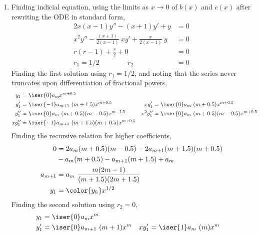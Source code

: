 \begin{enumerate}
    \item Finding indicial equation, using the limits as $ x \rightarrow 0 $
          of $ b(x) $ and $ c(x) $ after rewriting the ODE in standard form,
          \begin{align}
              2x(x-1)y'' - (x+1)y' + y                                 & = 0 \\
              x^2y'' - \frac{(x+1)}{2(x-1)}\ xy' + \frac{x}{2(x-1)}\ y & = 0 \\
              r(r-1) + \frac{r}{2} + 0                                 & = 0 \\
              r_1 = 1/2 \qquad\qquad r_2                               & = 0
          \end{align}
          Finding the first solution using $ r_1 = 1/2 $, and noting that the series
          never truncates upon differentiation of fractional powers,
          \begin{align}
              y_1       & = \iser{0} a_m x^{m + 0.5}                          \\
              y_1'      & = \iser{-1}a_{m+1}\ (m + 1.5)x^{m+0.5}            &
              xy_1'     & = \iser{0}a_{m}\ (m + 0.5)x^{m+0.5}                 \\
              y_1''     & = \iser{0}a_{m}\ (m + 0.5)(m - 0.5)x^{m - 1.5}    &
              x^2 y_1'' & = \iser{0}a_{m}\ (m + 0.5)(m - 0.5)x^{m + 0.5}      \\
              x y_1''   & = \iser{-1}a_{m+1}\ (m + 1.5)(m + 0.5)x^{m + 0.5}
          \end{align}
          Finding the recursive relation for higher coefficients,
          \begin{align}
              0       & = 2a_m(m+0.5)(m-0.5) - 2a_{m+1}(m+1.5)(m+0.5) \\
                      & - a_m(m+0.5) - a_{m+1}(m+1.5) + a_m           \\
              a_{m+1} & = a_m\ \frac{m(2m-1)}{(m+1.5)(2m+1.5)}        \\
              y_1     & = \color{y_h} x^{1/2}
          \end{align}
          Finding the second solution using $ r_2 = 0 $,
          \begin{align}
              y_1       & = \iser{0} a_m x^m                   \\
              y_1'      & = \iser{0}a_{m+1}\ (m+1)x^{m}      &
              xy_1'     & = \iser{1}a_{m}\ (m)x^{m}            \\

\end{align}
\end{enumerate}

